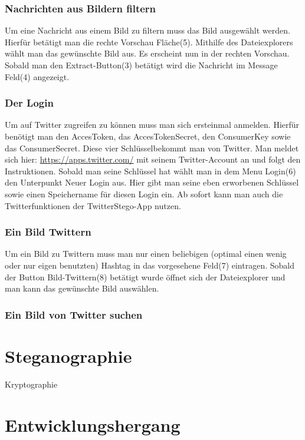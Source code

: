 \documentclass[11pt]{article}
\begin{document}
\newpage

\subsubsection{Nachrichten aus Bildern filtern}
Um eine Nachricht aus einem Bild zu filtern muss das Bild ausgewählt werden. Hierfür betätigt man die rechte Vorschau Fläche(5). Mithilfe des Dateiexplorers wählt man das gewünschte Bild aus. Es erscheint nun in der rechten Vorschau. Sobald man den Extract-Button(3) betätigt wird die Nachricht im Message Feld(4) angezeigt. 

\subsubsection{Der Login}
Um auf Twitter zugreifen zu können muss man sich ersteinmal anmelden. Hierfür benötigt man den AccesToken, das AccesTokenSecret, den ConsumerKey sowie das ConsumerSecret. Diese vier Schlüsselbekommt man von Twitter. Man meldet sich hier: \url{https://apps.twitter.com/} mit seinem Twitter-Account an und folgt den Instruktionen. Sobald man seine Schlüssel hat wählt man in dem Menu Login(6) den Unterpunkt Neuer Login aus. Hier gibt man seine eben erworbenen Schlüssel sowie einen Speichername für diesen Login ein.
Ab sofort kann man auch die Twitterfunktionen der TwitterStego-App nutzen.


\subsubsection{Ein Bild Twittern}
Um ein Bild zu Twittern muss man nur einen beliebigen (optimal einen wenig oder nur eigen benutzten) Hashtag in das vorgesehene Feld(7) eintragen. Sobald der Button Bild-Twittern(8) betätigt wurde öffnet sich der Dateiexplorer und man kann das gewünschte Bild auswählen. 

\subsubsection{Ein Bild von Twitter suchen}




\newpage
\section{Steganographie}

Kryptographie



\newpage
\section{Entwicklungshergang}
\end{document}
